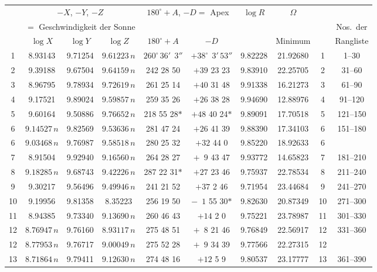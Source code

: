 \documentclass[12pt,a4paper]{article}
\theoremstyle{plain}
\theoremstyle{definition}
\theoremstyle{remark}
\begin{document}
\begin{small}
\begin{center}
\begin{tabular}{|c||c|c|c||c|c||c||c||c|c|}
\hline
& \multicolumn{3}{c||}{$-X$, $-Y$, $-Z$} &
\multicolumn{2}{c||}{$180^{\circ}+A$, $-D =$ Apex} &
$\log R$ & $\Omega$ & & \\
& \multicolumn{3}{c||}{$=$ Geschwindigkeit der Sonne} & & & & & &
Nos.~der \\
\hline
& $\log X$ & $\log Y$ & $\log Z$ & $180^{\circ}+A$ & $-D$ & & Minimum & & Rangliste \\
\hline
1 & 8.93143 & 9.71254 & $9.61223\,n$ & $260^{\circ}\,36'\;\,3''$ & $+38^{\circ}\;\,3'\,53''$ & 9.82228 & 21.92680 & 1 & 1--\phantom{0}30 \\
2 & 9.39188 & 9.67504 & $9.64159\,n$ & 242 28 50 & $+39$ 23 23 & 9.83910 & 22.25705 & 2 & 31--\phantom{0}60 \\
3 & 8.96795 & 9.78934 & $9.72619\,n$ & 261 25 14 & $+40$ 31 48 & 9.91338 & 16.21273 & 3 & 61--\phantom{0}90 \\
4 & 9.17521 & 9.89024 & $9.59857\,n$ & 259 35 26 & $+26$ 38 28 & 9.94690 & 12.88976 & 4 & 91--120 \\
\hline
5 & 9.60164 & 9.50886 & $9.76652\,n$ & 218 55 28$*$ & $+48$ 40 24$*$ & 9.89091 & 17.70518 & 5 & 121--150 \\
6 & $9.14527\,n$ & 9.82569 & $9.53636\,n$ & 281 47 24 & $+26$ 41 39 & 9.88390 & 17.34103 & 6 & 151--180 \\
6 & $9.03468\,n$ & 9.76987 & $9.58518\,n$ & 280 25 32 & $+32$ 44 \phantom{0}0 & 9.85220 & 18.92633 & 6 & \\
7 & 8.91504 & 9.92940 & $9.16560\,n$ & 264 28 27 & $+\phantom{0}9$ 43 47 & 9.93772 & 14.65823 & 7 & 181--210 \\
8 & $9.18285\,n$ & 9.68743 & $9.42226\,n$ & 287 22 31$*$ & $+27$ 23 46 & 9.75937 & 22.78534 & 8 & 211--240 \\
\hline
9 & 9.30217 & 9.56496 & $9.49946\,n$ & 241 21 52 & $+37$ \phantom{0}2 46 & 9.71954 & 23.44684 & 9 & 241--270 \\
10 & 9.19956 & 9.81358 & 8.35223 & 256 19 50 & $-\phantom{0}1$ 55 30$*$ & 9.82630 & 20.87349 & 10 & 271--300 \\
11 & 8.94385 & 9.73340 & $9.13690\,n$ & 260 46 43 & $+14$ \phantom{0}2 \phantom{0}0 & 9.75221 & 23.78987 & 11 & 301--330 \\
12 & $8.76947\,n$ & 9.76160 & $8.93117\,n$ & 275 48 51 & $+\phantom{0}8$ 21 46 & 9.76849 & 22.56917 & 12 & 331--360 \\
12 & $8.77953\,n$ & 9.76717 & $9.00049\,n$ & 275 52 28 & $+\phantom{0}9$ 34 39 & 9.77566 & 22.27315 & 12 & \\
13 & $8.71864\,n$ & 9.79411 & $9.12630\,n$ & 274 48 16 & $+12$ \phantom{0}5 \phantom{0}9 & 9.80537 & 23.17777 & 13 & 361--390 \\
\hline
\end{tabular}
\end{center}
\end{small}
\end{document}
